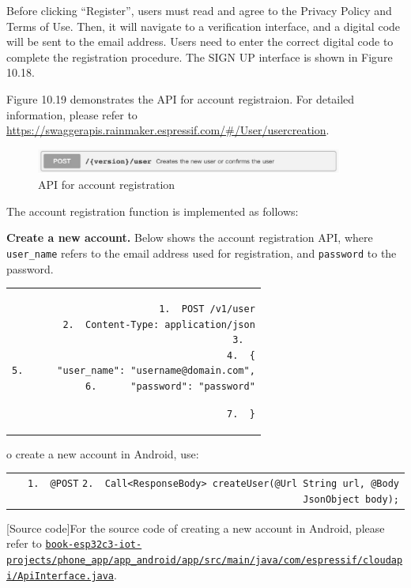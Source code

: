 \documentclass[a4paper,12pt,openany]{book}
\renewcommand{\ttfamily}{\fontfamily{pcr}\selectfont}
\renewcommand{\arraystretch}{1}
\newenvironment{codebloc}{ %
    \ttfamily\footnotesize
    \renewcommand{\arraystretch}{1}
}
\newcommand{\note}[2][NOTE]{ %
\vspace{6pt}
\begin{tabular}{b{\textwidth}}
\hline
\fontfamily{phv}\selectfont \textbf{#1}\\
\leftskip 1em #2\\
\hline
\end{tabular}
}
\begin{document}
Before clicking “Register”, users must read and agree to the Privacy Policy and Terms of Use. Then, it will navigate to a verification interface, and a digital code will be sent to the email address. Users need to enter the correct digital code to complete the registration procedure. The SIGN UP interface is shown in Figure 10.18.

Figure 10.19 demonstrates the API for account registraion. For detailed information, please refer to \url{https://swaggerapis.rainmaker.espressif.com/\#/User/usercreation}.

\begin{figure}[ht]
    \centering
    \includegraphics[width=0.9\textwidth]{D10Z/10-19}
    \caption{API for account registration}
\end{figure}

The account registration function is implemented as follows:

\textbf{Create a new account.} Below shows the account registration API, where \verb|user_name| refers to the email address used for registration, and \verb|password| to the password.

\begin{codebloc}
\begin{tabular}{d}
\vspace{2pt}
\begin{verbatim}
1.  POST /v1/user
2.  Content-Type: application/json
3.	
4.  {
5.      "user_name": "username@domain.com",
6.      "password": "password"
\end{verbatim}
\verb|7.  }|
\end{tabular}
\end{codebloc}

To create a new account in Android, use:

\begin{codebloc}
\begin{tabular}{d}
\verb|1.  @POST|\newline
\verb|2.  Call<ResponseBody> createUser(@Url String url, @Body JsonObject body);|
\end{tabular}
\end{codebloc}

\note[Source code]{For the source code of creating a new account in Android, please refer to \href{https://github.com/espressif/book-esp32c3-iot-projects/blob/main/phone_app/app_android/app/src/main/java/com/espressif/cloudapi/ApiInterface.java}{\texttt{book-esp32c3-iot-projects/phone\_app/app\_android/app/src/main/java/\newline com/espressif/cloudapi/ApiInterface.java}}.}
\end{document}
